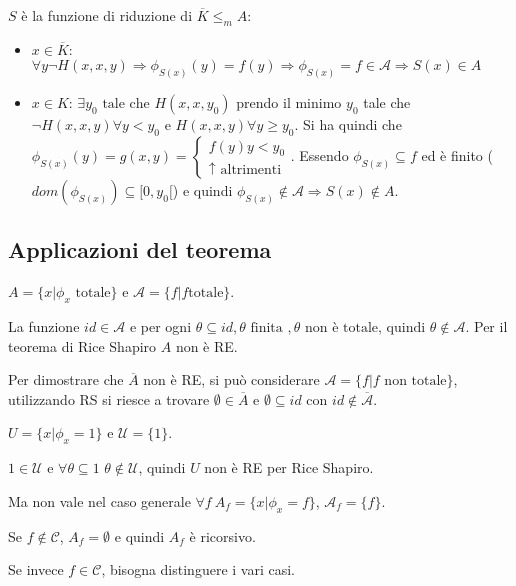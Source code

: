 $S$ è la funzione di riduzione di $\overline{K} \leq_m A$:

\begin{itemize}
	\item $x \in \overline{K}$: $\forall y \neg H(x,x,y) \Rightarrow \phi_{S(x)}(y) = f(y) \Rightarrow \phi_{S(x)} = f \in \mathcal{A} \Rightarrow S(x) \in A$
	\item $x \in K$: $\exists y_0 \text{ tale che } H(x,x,y_0)$ prendo il minimo $y_0$ tale che $\neg H(x,x,y) \forall y < y_0$ e $H(x,x,y) \forall y \geq y_0$. Si ha quindi che $\phi_{S(x)}(y) = g(x,y) = \begin{cases}
	f(y) y < y_0 \\
	\uparrow \text{ altrimenti}
	\end{cases}$. Essendo $\phi_{S(x)} \subseteq f$ ed è finito ($dom(\phi_{S(x)}) \subseteq [0,y_0[$) e quindi $\phi_{S(x)} \notin \mathcal{A} \Rightarrow S(x) \notin A$.
\end{itemize}

\subsection{Applicazioni del teorema}

$ A= \{ x | \phi_x \text{ totale} \}$ e $\mathcal{A} = \{ f | f \text{totale} \}$.

La funzione $id \in \mathcal{A}$ e per ogni $\theta \subseteq id, \theta \text{ finita }, \theta \text{ non è totale, quindi } \theta \notin \mathcal{A}$. Per il teorema di Rice Shapiro $A$ non è RE.

Per dimostrare che $\overline{A}$ non è RE, si può considerare $\mathcal{A} = \{ f | f \text{ non totale} \}$, utilizzando RS si riesce a trovare $\emptyset \in \overline{A}$ e $\emptyset \subseteq id$ con $id \notin \overline{\mathcal{A}}$.

$ U = \{ x | \phi_x = 1 \}$ e $\mathcal{U} = \{ 1 \}$.

$1 \in \mathcal{U} $ e $\forall \theta \subseteq 1$ $\theta \notin \mathcal{U}$, quindi $U$ non è RE per Rice Shapiro.

Ma non vale nel caso generale $\forall f \: A_f = \{ x | \phi_x = f \}$, $\mathcal{A}_f = \{ f \}$.

Se $f \notin \mathcal{C}$, $A_f = \emptyset$ e quindi $A_f$ è ricorsivo.

Se invece $f \in \mathcal{C}$, bisogna distinguere i vari casi.

